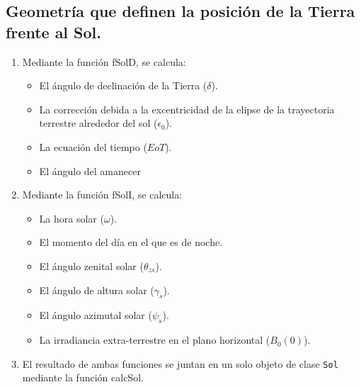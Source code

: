 \subsection{Geometría que definen la posición de la Tierra frente al Sol.}
\label{sec:org989660a}
\begin{enumerate}
\item Mediante la función fSolD, se calcula:
\begin{itemize}
\item El ángulo de declinación de la Tierra (\(\delta\)).
\item La corrección debida a la excentricidad de la elipse de la trayectoria terrestre alrededor del sol (\(\epsilon_0\)).
\item La ecuación del tiempo (\(EoT\)).
\item El ángulo del amanecer
\end{itemize}
\item Mediante la función fSolI, se calcula:
\begin{itemize}
\item La hora solar (\(\omega\)).
\item El momento del día en el que es de noche.
\item El ángulo zenital solar (\(\theta_{zs}\)).
\item El ángulo de altura solar (\(\gamma_s\)).
\item El ángulo azimutal solar (\(\psi_s\)).
\item La irradiancia extra-terrestre en el plano horizontal (\(B_0(0)\)).
\end{itemize}
\item El resultado de ambas funciones se juntan en un solo objeto de clase \texttt{Sol} mediante la función calcSol.
\end{enumerate}
